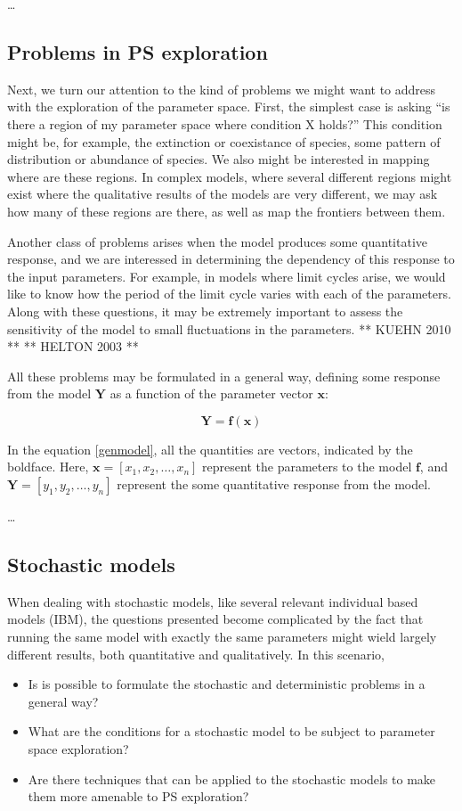 \documentclass[12pt,a4paper]{article}
\newcommand{\bu}[1]{\mbox{$\mathbf{#1}$}}
\begin{document}
\dots

\subsection{Problems in PS exploration}
Next, we turn our attention to the kind of problems we might want to address with the exploration of the parameter space.
First, the simplest case is asking ``is there a region of my parameter space where condition X holds?'' This condition
might be, for example, the extinction or coexistance of species, some pattern of distribution or abundance of species.
We also might be interested in mapping where are these regions. In complex models, where several different regions might
exist where the qualitative results of the models are very different, we may ask how many of these regions are there, as well
as map the frontiers between them. 

Another class of problems arises when the model produces some quantitative response, and we are interessed in determining
the dependency of this response to the input parameters. For example, in models where limit cycles arise, we would like to know
how the period of the limit cycle varies with each of the parameters. Along with these questions, it may be extremely important
to assess the sensitivity of the model to small fluctuations in the parameters.
** KUEHN 2010 **
** HELTON 2003 **

All these problems may be formulated in a general way, defining some response from the model $\bu{Y}$ as a function of the
parameter vector $\bu{x}$:

\begin{equation}
	\bu{Y} = \bu{f}(\bu{x})
	\label{genmodel}
\end{equation}

In the equation \ref{genmodel}, all the quantities are vectors, indicated by the boldface. Here, 
$\bu{x} = [ x_1,x_2,\dots,x_n ]$ represent the parameters to the model $\bu{f}$, and $\bu{Y} = [ y_1,y_2,\dots,y_n ]$ 
represent the some quantitative response from the model.

\dots

\subsection{Stochastic models}
When dealing with stochastic models, like several relevant individual based models (IBM), the questions presented become
complicated by the fact that running the same model with exactly the same parameters might wield largely different results,
both quantitative and qualitatively. In this scenario,
\begin{itemize}
	\item Is is possible to formulate the stochastic and deterministic problems in a general way?
	\item What are the conditions for a stochastic model to be subject to parameter space exploration?
	\item Are there techniques that can be applied to the stochastic models to make them more amenable to PS exploration?
\end{itemize}
\end{document}
